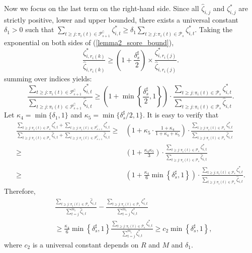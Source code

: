 \documentclass[
  12pt]{article}
\begin{document}
\noindent Now we focus on the last term on the right-hand side. Since all $\widehat{\zeta}_{i,j}$ and $\zeta^*_{i,j}$ are strictly positive, lower and upper bounded, there exists a universal constant $\delta_1>0 $ such that $\sum_{t \geq j: \pi_i(t) \in \mathcal{P}_{s+1}^{\complement}} \zeta_{i, t}^* \geq \delta_1 \sum_{t \geq j: \pi_i(t) \in \mathcal{P}_s} \zeta_{i, t}^*$. Taking the exponential on both sides of (\ref{lemma2_score_bound}),
\begin{equation*}
\frac{\zeta_{i, r_i(k)}^*}{\widehat{\zeta}_{i, r_i(k)}} \geq\left(1+\frac{\delta^\sharp_s}{2}\right) \times \frac{\zeta_{i, r_i(j)}^*}{\widehat{\zeta}_{i, r_i(j)}}.
\end{equation*} summing over indices yields:
$$\frac{\sum_{t \geq j: \pi_i(t) \in \mathcal{P}_{s+1}^{\complement}} \zeta_{i, t}^*}{\sum_{t \geq j: \pi_i(t) \in \mathcal{P}_{s+1}^{\complement}} \widehat{\zeta}_{i, t}} \geq\left(1+\min \left\{\frac{\delta_s^{\sharp}}{2}, 1\right\}\right) \cdot \frac{\sum_{t \geq j: \pi_i(t) \in \mathcal{P}_s} \zeta_{i, t}^*}{\sum_{t \geq j: \pi_i(t) \in \mathcal{P}_s} \widehat{\zeta}_{i, t}} .
$$Let $\kappa_4=\min \{\delta_1, 1\}$ and $\kappa_5=\min \{\delta_s^\sharp/2, 1\}$. It is easy to verify that 
\begin{equation*}
\begin{aligned}
\frac{\sum_{t \geq j: \pi_i(t) \in \mathcal{P}_s} \zeta_{i, t}^*+\sum_{t \geq j: \pi_i(t) \in \mathcal{P}_{s+1}^{\complement}} \zeta_{i, t}^*}{\sum_{t \geq j: \pi_i(t) \in \mathcal{P}_s} \widehat{\zeta}_{i, t}+\sum_{t \geq j: \pi_i(t) \in \mathcal{P}_{s+1}^{\complement}} \widehat{\zeta}_{i, t}} \geq &\left(1+\kappa_5 \cdot \frac{1+\kappa_4}{1+\kappa_4+\kappa_5}\right)\cdot \frac{\sum_{t \geq j: \pi_i(t) \in \mathcal{P}_s} \zeta_{i, t}^*}{\sum_{t \geq j: \pi_i(t) \in \mathcal{P}_s} \widehat{\zeta}_{i, t}}\\
\geq & \left(1+\frac{\kappa_4 \kappa_5}{3}\right)\cdot \frac{\sum_{t \geq j: \pi_i(t) \in \mathcal{P}_s} \zeta_{i, t}^*}{\sum_{t \geq j: \pi_i(t) \in \mathcal{P}_s} \widehat{\zeta}_{i, t}}\\
\geq & \left(1+\frac{\kappa_4}{6} \min \left\{\delta_s^{\sharp}, 1\right\}\right) \cdot \frac{\sum_{t \geq j: \pi_i(t) \in \mathcal{P}_s} \zeta_{i, t}^*}{\sum_{t \geq j: \pi_i(t) \in \mathcal{P}_s} \widehat{\zeta}_{i, t}}.
\end{aligned}
\end{equation*}
Therefore,
\begin{align}
& \frac{\sum_{t \geq j: \pi_i(t) \in \mathcal{P}_{s}} \widehat{\zeta}_{i,t}}{\sum_{t=j}^{m_i} \widehat{\zeta}_{i,t}}-\frac{\sum_{t \geq j: \pi_i(t) \in \mathcal{P}_{s}} \zeta^*_{i,t}}{\sum_{t=j}^{m_i} \zeta^*_{i,t}} \nonumber\\
& \geq \frac{\kappa_4}{6} \min \left\{\delta_s^{\sharp}, 1\right\} \frac{\sum_{t \geq j: \pi_i(t) \in \mathcal{P}_{s}} \zeta^*_{i,t}}{\sum_{t=j}^{m_i} \zeta^*_{i,t}} \geq c_2 \min \left\{\delta_s^{\sharp}, 1\right\},\label{lemma2_sub1}
\end{align}
\noindent where $c_2$ is a universal constant depends on $R$ and $M$ and $\delta_1$.
\end{document}
